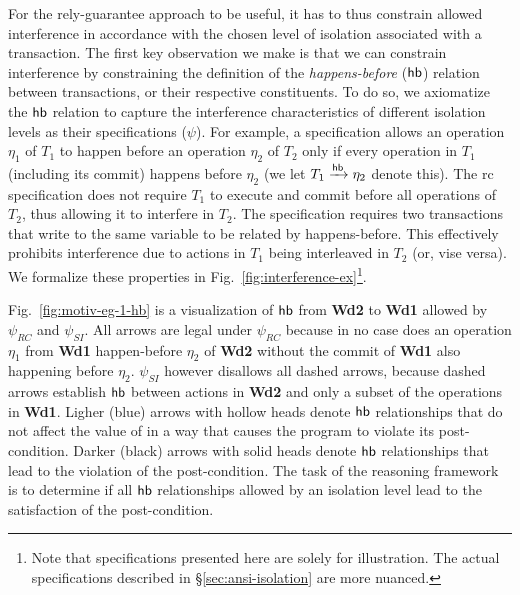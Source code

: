 For the rely-guarantee approach to be useful, it has to thus constrain
allowed interference in accordance with the chosen level of isolation
associated with a transaction. The first key observation we make is
that we can constrain interference by constraining the definition of
the \emph{happens-before} ($\textsf{hb}$) relation between transactions, or
their respective constituents.  To do so, we axiomatize the $\textsf{hb}$
relation to capture the interference characteristics of different
isolation levels as their specifications ($\psi$). For example, a
 specification allows an operation $\eta_1$ of
$T_1$ to happen before an operation $\eta_2$ of $T_2$ only if every
operation in $T_1$ (including its commit) happens before $\eta_2$ (we
let $T_1 \xrightarrow{\textsf{hb}} \eta_2$ denote this). The {\sc rc} specification
does not require $T_1$ to execute and commit before all operations of
$T_2$, thus allowing it to interfere in $T_2$. The  specification requires two transactions that write to the
same variable to be related by happens-before.  This effectively
prohibits interference due to actions in $T_1$ being interleaved in
$T_2$ (or, vise versa).  We formalize these properties in Fig.~\ref{fig:interference-ex}\footnote{Note that specifications
    presented here are solely for illustration. The actual
    specifications described in \S\ref{sec:ansi-isolation} are more nuanced.}.


Fig.~\ref{fig:motiv-eg-1-hb} is a visualization of $\textsf{hb}$ 
from {\bf Wd2} to {\bf Wd1} allowed by $\psi_{RC}$ and $\psi_{SI}$. All
arrows are legal under $\psi_{RC}$ because in no case does an operation
$\eta_1$ from {\bf Wd1} happen-before $\eta_2$ of {\bf Wd2} without the commit
of {\bf Wd1} also happening before $\eta_2$. $\psi_{SI}$ however disallows
all dashed arrows, because dashed arrows establish $\textsf{hb}$ between actions in {\bf Wd2}
and only a subset of the operations in {\bf Wd1}. Ligher (blue) arrows with
hollow heads denote $\textsf{hb}$ relationships that do not affect the value
of  in a way that causes the program to violate its
post-condition.  Darker (black) arrows with solid heads denote $\textsf{hb}$
relationships that lead to the violation of the post-condition. The task of
the reasoning framework is to determine if all $\textsf{hb}$ relationships
allowed by an isolation level lead to the satisfaction of the
post-condition.


